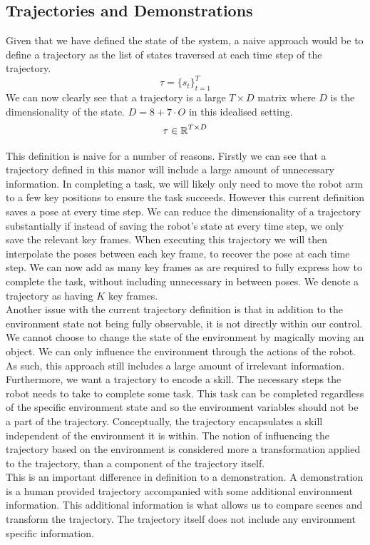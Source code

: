 \subsection{Trajectories and Demonstrations}
Given that we have defined the state of the system, a naive approach would be to define a trajectory as the list of states traversed at each time step of the trajectory.
$$\tau = \{s_t\}_{t=1}^T$$
We can now clearly see that a trajectory is a large $T \times D$ matrix where $D$ is the dimensionality of the state. $D = 8 + 7 \cdot O$ in this idealised setting.
$$\tau \in \operatorname{\mathbb{R}}^{T \times D}$$

This definition is naive for a number of reasons. Firstly we can see that a trajectory defined in this manor will include a large amount of unnecessary information. In completing a task, we will likely only need to move the robot arm to a few key positions to ensure the task succeeds. However this current definition saves a pose at every time step. We can reduce the dimensionality of a trajectory substantially if instead of saving the robot's state at every time step, we only save the relevant key frames. When executing this trajectory we will then interpolate the poses between each key frame, to recover the pose at each time step. We can now add as many key frames as are required to fully express how to complete the task, without including unnecessary in between poses. We denote a trajectory as having $K$ key frames.\\

Another issue with the current trajectory definition is that in addition to the environment state not being fully observable, it is not directly within our control. We cannot choose to change the state of the environment by magically moving an object. We can only influence the environment through the actions of the robot. As such, this approach still includes a large amount of irrelevant information. Furthermore, we want a trajectory to encode a skill. The necessary steps the robot needs to take to complete some task. This task can be completed regardless of the specific environment state and so the environment variables should not be a part of the trajectory. Conceptually, the trajectory encapsulates a skill independent of the environment it is within. The notion of influencing the trajectory based on the environment is considered more a transformation applied to the trajectory, than a component of the trajectory itself.\\

This is an important difference in definition to a demonstration. A demonstration is a human provided trajectory accompanied with some additional environment information. This additional information is what allows us to compare scenes and transform the trajectory. The trajectory itself does not include any environment specific information.\\

